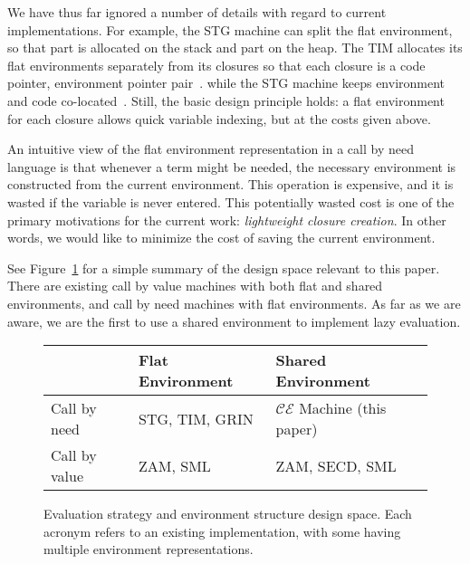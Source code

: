 We have thus far ignored a number of details with regard to current
implementations. For example, the STG machine can split the flat environment, so
that part is allocated on the stack and part on the heap.  The TIM allocates its
flat environments separately from its closures so that each closure is a code
pointer, environment pointer pair~\cite{TIM}. while the STG machine keeps
environment and code co-located~\cite{jonesstg}. Still, the basic design
principle holds: a flat environment for each closure allows quick variable
indexing, but at the costs given above.

An intuitive view of the flat environment representation in a call by need
language is that whenever a term might be needed, the necessary environment is
constructed from the current environment.  This operation is expensive, and
it is wasted if the variable is never entered. This potentially wasted cost is
one of the primary motivations for the current work: \emph{lightweight
closure creation}. In other words, we would like to minimize the cost of saving
the current environment.

See Figure~\ref{fig:designspace} for a simple summary of the design space
relevant to this paper. There are existing call by value machines with both flat
and shared environments, and call by need machines with flat environments. As
far as we are aware, we are the first to use a shared environment to implement
lazy evaluation.

\begin{figure}
\begin{tabularx}{\textwidth}{l | X | X}
                & Flat Environment     & Shared Environment \\ \hline
  Call by need  & STG, TIM, GRIN & $\mathcal{CE}$ Machine (this paper) \\
  Call by value & ZAM, SML & ZAM, SECD, SML \\
\end{tabularx}
\caption{Evaluation strategy and environment structure design space. Each
acronym refers to an existing implementation, with some having multiple environment
representations.}
\label{fig:designspace}
\end{figure}

